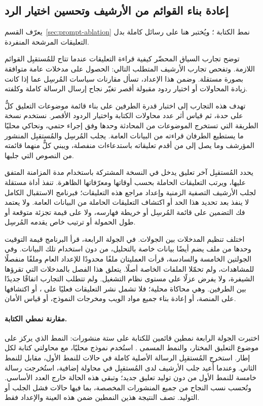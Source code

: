 \subsection{إعادة بناء القوائم من الأرشيف وتحسين اختيار الرد}
\label{sec:fresh-archive}


يعرّف القسم~\ref{sec:prompt-ablation} نمط الكتابة ؛ ويُختبر هنا على رسائل كاملة بدل التعليقات المرشحة المنفردة.

توضح تجارب السياق المحضّر كيفية قراءة التعليقات عندما تتاح للمُستقبِل القوائم اللازمة. وتفحص تجارب الأرشيف المتطلب التالي: الحصول على مدخلات عامة متوافقة بصورة مستقلة. وضمن هذا الإعداد، تسأل مقارنات سياسات المُرسِل عما إذا كانت زيادة المحاولات أو اختيار ردود مقبولة أقصر تغيّر نجاح إرسال الرسالة كاملة وكلفته.

تهدف هذه التجارب إلى اختبار قدرة الطرفين على بناء قائمة موضوعات التعليق كلٌّ على حدة، ثم قياس أثر عدد محاولات الكتابة واختيار الردود الأقصر. نستخدم نسخة الطريقة التي تستخرج الموضوعات من المحادثة وحدها وفق إجراء حتمي، ونحاكي محليًا ما يستطيع الطرفان قراءته من البيانات العامة. يجلب المُرسِل والمُستقبِل المنشور المؤرشف وما يصل إلى  من أقدم تعليقاته باستدعاءات منفصلة، ويبني كلٌّ منهما قائمته من النصوص التي جلبها.

يحدد المُستقبِل آخر تعليق يدخل في النسخة المشتركة باستخدام مدة المزامنة المتفق عليها، ويرتب التعليقات الحاملة بحسب أوقاتها ومعرّفاتها الظاهرة. تنفذ أداة مستقلة لجلب الأرشيف التصفية الزمنية وإعداد مراجع هذه التعليقات؛ فبرنامج الاستقبال الكامل لا ينفذ بعد تحديد هذا الحد أو اكتشاف التعليقات الحاملة من البيانات العامة. ولا يعتمد فك التضمين على قائمة المُرسِل أو خريطة فهارسه، ولا على قيمة تجزئة متوقعة أو طول الحمولة أو ترتيب خاص يقدمه المُرسِل.

اختلف تنظيم المدخلات بين الجولات. في الجولة الرابعة، قرأ البرنامج قيمة التوقيت وحدها من ملف يضم أيضًا بيانات خاصة بالتحليل، من دون استخدام تلك البيانات. وفي الجولتين الخامسة والسادسة، قرأت العمليتان ملفًا محدودًا للإعداد العام وملفًا منفصلًا للمشاهدات، ولم تحمّلا الملفات الخاصة أصلًا. يتعلق هذا الفصل بالمدخلات التي تقرؤها الشيفرة، ولا يفرض عزلًا على مستوى نظام التشغيل. ولم تتطلب التجارب اتفاقًا جديدًا بين الطرفين. وهي محاكاة محلية؛ فلا تشمل نشر التعليقات فعليًا على ، أو اكتشافها على المنصة، أو إعادة بناء جميع مواد الويب ومخرجات النموذج، أو قياس الأمان.

\paragraph{مقارنة نمطي الكتابة.}
اختبرت الجولة الرابعة نمطين قائمين للكتابة على ستة منشورات: النمط الذي يركز على موضوع التعليق المختار، والنمط المسمى . استُخدم نموذج  محليًا، مع محاولتي كتابة لكل إطار. استخرج المُستقبِل الرسالة الأصلية كاملة في \NUM{\FreshFourAnchoredExact/\FreshAssigned} حالات للنمط الأول، مقابل \NUM{\FreshFourGfiveExact/\FreshAssigned} للنمط الثاني. وعندما أُعيد جلب الأرشيف لدى المُستقبِل في محاولة إضافية، استُخرجت رسالة خامسة للنمط الأول من دون توليد تعليق جديد؛ وتبقى هذه الحالة خارج العدد الأساسي. وتُحسب نسب النجاح من جميع المنشورات المخصصة، بما فيها حالات فشل الجلب أو التوليد. تصف النتيجة هذين النمطين ضمن هذه العينة والإعداد فقط.

